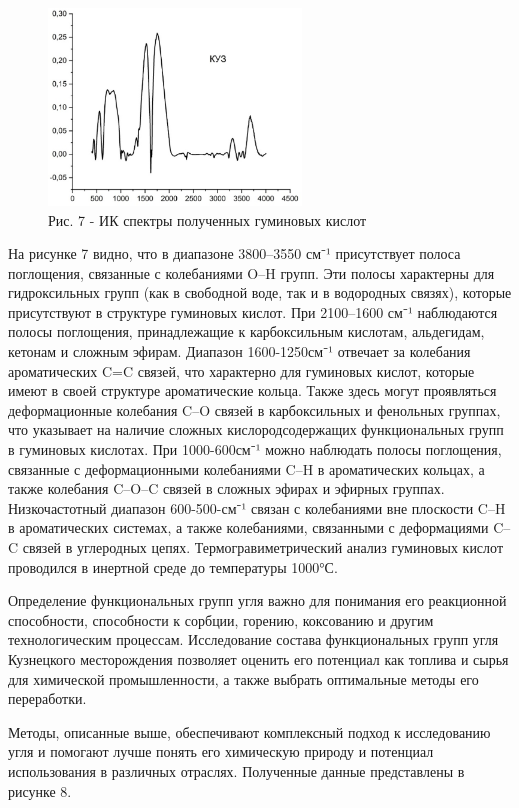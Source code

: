 \begin{figure}[H]
	\centering
	\includegraphics[width=0.6\textwidth]{media/gorn3/image18}
	\caption*{Рис. 7 - ИК спектры полученных гуминовых кислот}
\end{figure}

\begin{multicols}{2}
На рисунке 7 видно, что в диапазоне 3800--3550 см⁻¹ присутствует полоса
поглощения, связанные с колебаниями O--H групп. Эти полосы характерны
для гидроксильных групп (как в свободной воде, так и в водородных
связях), которые присутствуют в структуре гуминовых кислот. При
2100--1600 см⁻¹ наблюдаются полосы поглощения, принадлежащие к
карбоксильным кислотам, альдегидам, кетонам и сложным эфирам. Диапазон
1600-1250см⁻¹ отвечает за колебания ароматических C=C связей, что
характерно для гуминовых кислот, которые имеют в своей структуре
ароматические кольца. Также здесь могут проявляться деформационные
колебания C--O связей в карбоксильных и фенольных группах, что указывает
на наличие сложных кислородсодержащих функциональных групп в гуминовых
кислотах. При 1000-600см⁻¹ можно наблюдать полосы поглощения, связанные
с деформационными колебаниями C--H в ароматических кольцах, а также
колебания C--O--C связей в сложных эфирах и эфирных группах.
Низкочастотный диапазон 600-500-см⁻¹ связан с колебаниями вне плоскости
C--H в ароматических системах, а также колебаниями, связанными с
деформациями C--C связей в углеродных цепях. Термогравиметрический
анализ гуминовых кислот проводился в инертной среде до температуры
1000°С.

Определение функциональных групп угля важно для понимания его
реакционной способности, способности к сорбции, горению, коксованию и
другим технологическим процессам. Исследование состава функциональных
групп угля Кузнецкого месторождения позволяет оценить его потенциал как
топлива и сырья для химической промышленности, а также выбрать
оптимальные методы его переработки.

Методы, описанные выше, обеспечивают комплексный подход к исследованию
угля и помогают лучше понять его химическую природу и потенциал
использования в различных отраслях. Полученные данные представлены в
рисунке 8.
\end{multicols}

